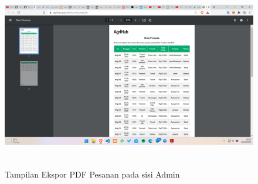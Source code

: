 \begin{enumerate}
\begin{enumerate}[a.]
		\begin{figure}[H]
			\centering
			{\includegraphics [width = 13cm, height= 7.5cm]{gambar/admin/export_pesanan_admin}}
			\caption{Tampilan Ekspor PDF Pesanan pada sisi Admin}
			\label{export_pesanan_admin}
		\end{figure}


\end{enumerate}
\end{enumerate}
